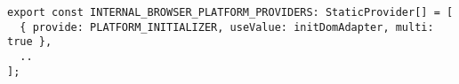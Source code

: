 \begin{verbatim}
export const INTERNAL_BROWSER_PLATFORM_PROVIDERS: StaticProvider[] = [
  { provide: PLATFORM_INITIALIZER, useValue: initDomAdapter, multi: true },
  ..
];
\end{verbatim}
